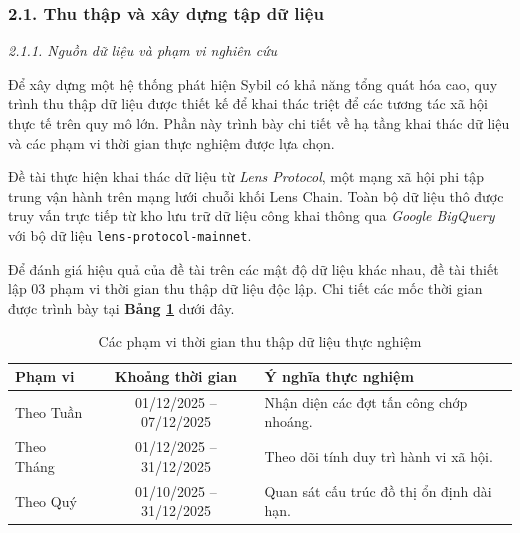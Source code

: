\subsubsection{2.1. Thu thập và xây dựng tập dữ liệu }

\textit{2.1.1. Nguồn dữ liệu và phạm vi nghiên cứu}\vspace{0.2cm}

\indent Để xây dựng một hệ thống phát hiện Sybil có khả năng tổng quát hóa cao, quy trình thu thập dữ liệu được thiết kế để khai thác triệt để các tương tác xã hội thực tế trên quy mô lớn. Phần này trình bày chi tiết về hạ tầng khai thác dữ liệu và các phạm vi thời gian thực nghiệm được lựa chọn.\vspace{0.3cm}

Đề tài thực hiện khai thác dữ liệu từ \textit{Lens Protocol}, một mạng xã hội phi tập trung vận hành trên mạng lưới chuỗi khối Lens Chain. Toàn bộ dữ liệu thô được truy vấn trực tiếp từ kho lưu trữ dữ liệu công khai thông qua \textit{Google BigQuery} với bộ dữ liệu \texttt{lens-protocol-mainnet}.\vspace{0.3cm}

Để đánh giá hiệu quả của đề tài trên các mật độ dữ liệu khác nhau, đề tài thiết lập 03 phạm vi thời gian thu thập dữ liệu độc lập. Chi tiết các mốc thời gian được trình bày tại \textbf{Bảng \ref{tab:TimeScopes}} dưới đây.

\begin{table}[H]
    \centering
    \caption{Các phạm vi thời gian thu thập dữ liệu thực nghiệm}
    \label{tab:TimeScopes}
    \setlength{\tabcolsep}{10pt}
    \renewcommand{\arraystretch}{1.3}
    \begin{tabular}{|l|c|l|}
        \hline
        \textbf{Phạm vi} & \textbf{Khoảng thời gian} & \textbf{Ý nghĩa thực nghiệm} \\ \hline
        Theo Tuần & 01/12/2025 -- 07/12/2025 & Nhận diện các đợt tấn công chớp nhoáng. \\ \hline
        Theo Tháng & 01/12/2025 -- 31/12/2025 & Theo dõi tính duy trì hành vi xã hội. \\ \hline
        Theo Quý & 01/10/2025 -- 31/12/2025 & Quan sát cấu trúc đồ thị ổn định dài hạn. \\ \hline
    \end{tabular}
\end{table}

